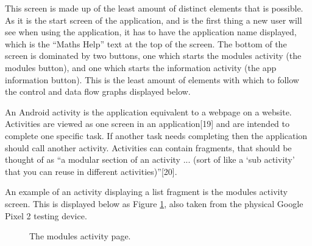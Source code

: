 \documentclass{article}
\begin{document}
This screen is made up of the least amount of distinct elements that is possible. As it is the start screen of the application, and is the first thing a new user will see when using the application, it has to have the application name displayed, which is the ``Maths Help'' text at the top of the screen. The bottom of the screen is dominated by two buttons, one which starts the modules activity (the modules button), and one which starts the information activity (the app information button). This is the least amount of elements with which to follow the control and data flow graphs displayed below. \par

An Android activity is the application equivalent to a webpage on a website. Activities are viewed as one screen in an application[19] and are intended to complete one specific task. If another task needs completing then the application should call another activity. Activities can contain fragments, that should be thought of as ``a modular section of an activity ... (sort of like a `sub activity' that you can reuse in different activities)''[20]. \par

An example of an activity displaying a list fragment is the modules activity screen. This is displayed below as Figure \ref{figure:applicationModulesPage}, also taken from the physical Google Pixel 2 testing device. 

\begin{figure}[H]
	\centering
	\caption{The modules activity page.}
	\label{figure:applicationModulesPage}
\end{figure}
\end{document}
